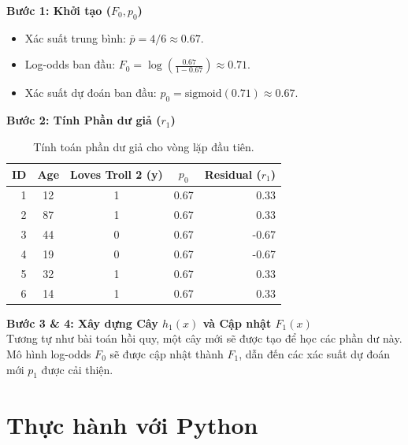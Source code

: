 \textbf{Bước 1: Khởi tạo ($F_0, p_0$)}
\begin{itemize}
    \item Xác suất trung bình: $\bar{p} = 4/6 \approx 0.67$.
    \item Log-odds ban đầu: $F_0 = \log(\frac{0.67}{1-0.67}) \approx 0.71$.
    \item Xác suất dự đoán ban đầu: $p_0 = \text{sigmoid}(0.71) \approx 0.67$.
\end{itemize}

\textbf{Bước 2: Tính Phần dư giả ($r_1$)}
\begin{table}[H]
\centering
\begin{tabular}{rcccr}
\toprule
\textbf{ID} & \textbf{Age} & \textbf{Loves Troll 2 (y)} & \textbf{$p_0$} & \textbf{Residual ($r_1$)} \\
\midrule
1 & 12 & 1 & 0.67 & 0.33 \\
2 & 87 & 1 & 0.67 & 0.33 \\
3 & 44 & 0 & 0.67 & -0.67 \\
4 & 19 & 0 & 0.67 & -0.67 \\
5 & 32 & 1 & 0.67 & 0.33 \\
6 & 14 & 1 & 0.67 & 0.33 \\
\bottomrule
\end{tabular}
\caption{Tính toán phần dư giả cho vòng lặp đầu tiên.}
\end{table}

\textbf{Bước 3 \& 4: Xây dựng Cây $h_1(x)$ và Cập nhật $F_1(x)$} \\
Tương tự như bài toán hồi quy, một cây mới sẽ được tạo để học các phần dư này. Mô hình log-odds $F_0$ sẽ được cập nhật thành $F_1$, dẫn đến các xác suất dự đoán mới $p_1$ được cải thiện.

\section{Thực hành với Python}
